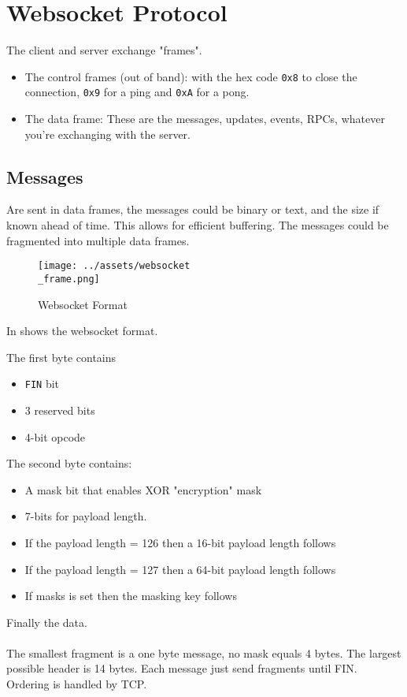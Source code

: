 \documentclass[../CMPUT-404-Notes.tex]{subfiles}
\begin{document}
\section{Websocket Protocol}
The client and server exchange "frames".
\begin{itemize}
    \item The control frames (out of band): with the hex code \texttt{0x8} to close the connection, \texttt{0x9} for a ping and \texttt{0xA} for a pong. 
    \item The data frame: These are the messages, updates, events, RPCs, whatever you're exchanging with the server.    
\end{itemize}

\subsection{Messages}
Are sent in data frames, the messages could be binary or text, and the size if known ahead of time. This allows for efficient buffering.
The messages could be fragmented into multiple data frames.

\begin{figure}[!h]
    \centering
    \texttt{[image: ../assets/websocket\\\_frame.png]}
    \caption{Websocket Format}
    \label{fig:websocket}
\end{figure}

In  shows the websocket format.

The first byte contains
\begin{itemize}
    \item \texttt{FIN} bit 
    \item 3 reserved bits 
    \item 4-bit opcode  
\end{itemize} 
The second byte contains:
\begin{itemize}
    \item A mask bit that enables XOR "encryption" mask 
    \item 7-bits for payload length.
    \item If the payload length = 126 then a 16-bit payload length follows
    \item If the payload length = 127 then a 64-bit payload length follows
    \item If masks is set then the masking key follows
\end{itemize}
Finally the data.
\\~\\
The smallest fragment is a one byte message, no mask equals 4 bytes. 
The largest possible header is 14 bytes.
Each message just send fragments until FIN.
Ordering is handled by TCP. 
\end{document}
